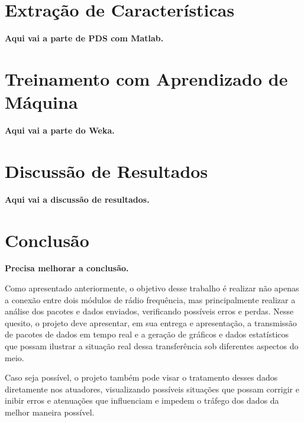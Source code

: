\documentclass[conference]{IEEEtran}
\begin{document}
\section{Extração de Características}

\textbf{Aqui vai a parte de PDS com Matlab.}

\section{Treinamento com Aprendizado de Máquina}

\textbf{Aqui vai a parte do Weka.}

\section{Discussão de Resultados}

\textbf{Aqui vai a discussão de resultados.}

\section{Conclus\~ao}

\textbf{Precisa melhorar a conclusão.}

Como apresentado anteriormente, o objetivo desse trabalho \'e realizar n\~ao apenas a conex\~ao entre dois m\'odulos de r\'adio frequ\^encia, mas principalmente realizar a an\'alise dos pacotes e dados enviados, verificando poss\'iveis erros e perdas. Nesse quesito, o projeto deve apresentar, em sua entrega e apresenta\c{c}\~ao, a transmiss\~ao de pacotes de dados em tempo real e a gera\c{c}\~ao de gr\'aficos e dados estat\'isticos que possam ilustrar a situa\c{c}\~ao real dessa transfer\^encia sob diferentes aspectos do meio.

Caso seja poss\'ivel, o projeto tamb\'em pode visar o tratamento desses dados diretamente nos atuadores, visualizando poss\'iveis situa\c{c}\~oes que possam corrigir e inibir erros e atenua\c{c}\~oes que influenciam e impedem o tr\'afego dos dados da melhor maneira poss\'ivel.





\end{document}
